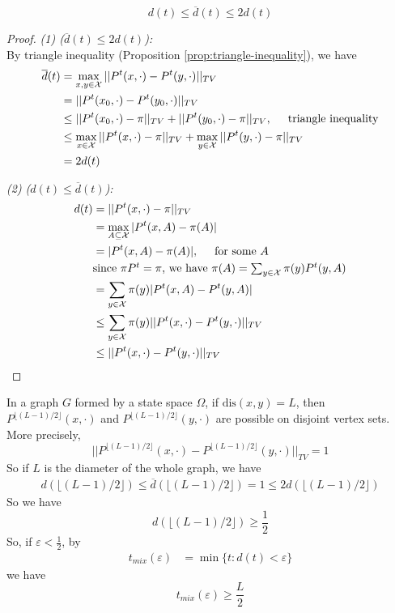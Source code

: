 \begin{lemma}
  \[d(t) \leq \overline{d}(t) \leq 2d(t)\]
\end{lemma}
\begin{proof}
  \emph{(1) ($\overline{d}(t) \leq 2d(t)$):} \\
  By triangle inequality (Proposition \ref{prop:triangle-inequality}), we have
  \begin{align*}
    \overline{d}(t) &= \max_{x,y\in\mathcal{X}}||P^t(x, \cdot) - P^t(y,\cdot)||_{TV} \\
                    &= ||P^t(x_0, \cdot) - P^t(y_0,\cdot)||_{TV} \\
                    &\leq ||P^t(x_0,\cdot) - \pi||_{TV} + ||P^t(y_0,\cdot) - \pi||_{TV},\hspace{0.5cm} \mbox{triangle inequality} \\
                    &\leq \max_{x\in\mathcal{X}}||P^t(x,\cdot) - \pi||_{TV} + \max_{y\in\mathcal{X}}||P^t(y,\cdot) - \pi||_{TV} \\
                    &= 2d(t)
  \end{align*}

  \emph{(2) ($d(t)\leq \overline{d}(t)$):}\\
  \begin{align*}
    d(t) &= ||P^t(x,\cdot) - \pi||_{TV} \\
         &= \max_{A\subseteq \mathcal{X}} |P^t(x, A) - \pi(A)| \\
         &= |P^t(x, A) - \pi(A)|,\hspace{0.5cm}\mbox{for some $A$} \\
         &\mbox{since $\pi P^t = \pi$, we have $\pi(A) = \sum_{y\in\mathcal{X}} \pi(y)P^t(y,A)$} \\
         &= \sum_{y\in\mathcal{X}} \pi(y) |P^t(x, A) - P^t(y, A)| \\
         &\leq \sum_{y\in\mathcal{X}} \pi(y) ||P^t(x, \cdot) - P^t(y,\cdot)||_{TV} \\
         &\leq ||P^t(x, \cdot) - P^t(y,\cdot)||_{TV} \qedhere
  \end{align*}
\end{proof}

In a graph $G$ formed by a state space $\Omega$,
if $\mbox{dis}(x,y) = L$, then $P^{\lfloor(L-1)/2\rfloor}(x, \cdot)$ and $P^{\lfloor(L-1)/2\rfloor}(y, \cdot)$ are possible on disjoint vertex sets.
More precisely,
\[||P^{\lfloor(L-1)/2\rfloor}(x,\cdot) - P^{\lfloor(L-1)/2\rfloor}(y,\cdot)||_{TV} = 1\]
So if $L$ is the diameter of the whole graph, we have
\begin{align*}
  d(\lfloor(L-1)/2\rfloor) \leq \overline{d}(\lfloor(L-1)/2\rfloor) = 1 \leq 2 d(\lfloor(L-1)/2\rfloor)
\end{align*}
So we have
\[d(\lfloor(L-1)/2\rfloor)\geq \frac{1}{2}\]
So, if $\varepsilon < \frac{1}{2}$, by
\begin{align*}
  t_{mix}(\varepsilon) &= \min\{t: d(t) < \varepsilon\}
\end{align*}
we have
\[t_{mix}(\varepsilon) \geq \frac{L}{2}\]
